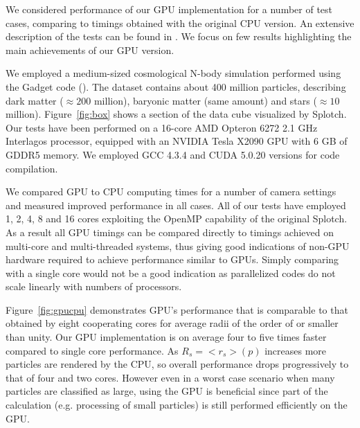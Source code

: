 \documentclass[11pt,twoside]{article}
\begin{document}
We considered performance of our GPU implementation for a number of test cases,
comparing to timings obtained with the original CPU version. An extensive description of the 
tests can be found in \citet{cusplotch}. We focus on few results highlighting the main achievements
of our GPU version.

We employed a medium-sized cosmological
N-body simulation performed using the Gadget code (\citet{springel2005}). The dataset contains about
400 million particles, describing dark matter ($\approx 200$ million),
baryonic matter (same amount) and stars ($\approx 10$ million).
Figure~\ref{fig:box} shows a section of the data cube visualized by Splotch.
Our tests have been performed on a 16-core AMD Opteron 6272 2.1 GHz Interlagos processor, equipped with 
an NVIDIA Tesla X2090 GPU with 6 GB of GDDR5 memory.
We employed GCC 4.3.4 and CUDA 5.0.20 versions for code compilation.

We compared GPU to CPU computing times for a number of camera settings and measured improved performance in all cases. All of our tests have employed
1, 2, 4, 8 and 16 cores exploiting the OpenMP capability of the original Splotch. As a result all GPU timings can be compared directly to
timings achieved on multi-core and multi-threaded systems, thus giving good indications of non-GPU hardware required to achieve performance similar to GPUs. Simply comparing with a single core would not be a good indication as parallelized codes do not scale linearly with numbers of processors.

Figure~\ref{fig:gpucpu} demonstrates GPU's performance that is
comparable to that obtained by eight cooperating cores for average radii of the order of or smaller
than unity. Our GPU implementation is on average four to five times faster compared to single
core performance. As $R_s=<r_s>(p)$ increases more particles are rendered by the CPU, so overall performance drops progressively to that of four and two cores. However even in
a worst case scenario when many particles are classified as large, using the GPU is beneficial since part of the calculation (e.g. processing of small particles)
is still performed efficiently on the GPU.
\end{document}
